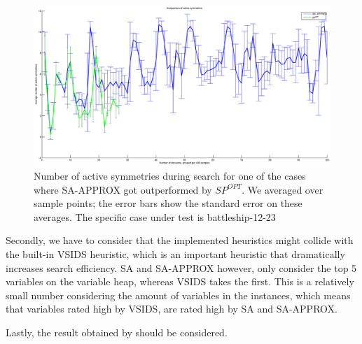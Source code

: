 	\begin{figure}[!ht]
		\center
		\centerline{\includegraphics[width=1.2\textwidth]{results/battleship-12-23-approx-vs-reg.eps}}
		\caption{
			Number of active symmetries during search for one of the cases where SA-APPROX got
			outperformed by $SP^{OPT}$.
			We averaged over sample points; the error bars show the standard error on these
			averages.
			The specific case under test is battleship-12-23
		}
		\label{fig:active_symmetries_during_search}
	\end{figure}

	Secondly, we have to consider that the implemented heuristics might collide with the built-in
	VSIDS heuristic, which is an important heuristic that dramatically increases search efficiency.
	SA and SA-APPROX however, only consider the top 5 variables on the variable heap, whereas VSIDS
	takes the first.
	This is a relatively small number considering the amount of variables in the instances,
	which means that variables rated high by VSIDS, are rated high by SA and SA-APPROX.

	Lastly, the result obtained by \cite{devriendt2012symmetry} should be considered. 

